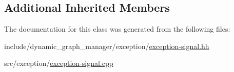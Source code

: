 \subsection*{Additional Inherited Members}


The documentation for this class was generated from the following files\+:\begin{DoxyCompactItemize}
\item 
include/dynamic\+\_\+graph\+\_\+manager/exception/\hyperlink{exception-signal_8hh}{exception-\/signal.\+hh}\item 
src/exception/\hyperlink{exception-signal_8cpp}{exception-\/signal.\+cpp}\end{DoxyCompactItemize}

